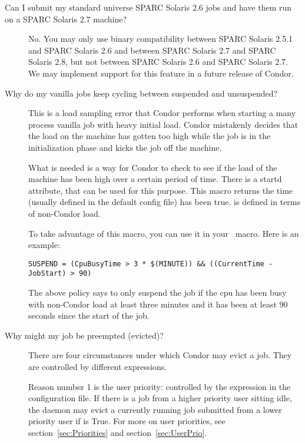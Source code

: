 \begin{description}
\begin{enumerate}
\end{enumerate}

\item[Can I submit my standard universe SPARC Solaris 2.6 jobs and have them run on a SPARC Solaris 2.7 machine?]

No. You may only use binary compatibility between SPARC Solaris 2.5.1
and SPARC Solaris 2.6 and between SPARC Solaris 2.7 and SPARC Solaris
2.8, but not between SPARC Solaris 2.6 and SPARC Solaris 2.7.  We may
implement support for this feature in a future release of Condor.

\item[Why do my vanilla jobs keep cycling between suspended and unsuspended?]

This is a load sampling error that Condor performs when starting a many
process vanilla job with heavy initial load.
Condor mistakenly decides that the load on the machine has gotten too
high while the job is in the initialization phase and kicks the job off
the machine.

What is needed is a way for Condor to check to see if the load of the machine
has been high over a certain period of time. There is a startd attribute,
 that can be used for this purpose. This macro
returns the time (usually defined in the default
config file) has been true.  is defined in terms of
non-Condor load.

To take advantage of this macro, you can use it in your \ macro.
Here is an example:
\begin{verbatim}
SUSPEND = (CpuBusyTime > 3 * $(MINUTE)) && ((CurrentTime - JobStart) > 90)
\end{verbatim}

The above policy says to only suspend the job if the cpu has been busy
with non-Condor load at least three minutes and it has been at least 90
seconds since the start of the job.

\item[Why might my job be preempted (evicted)?]

There are four circumstances under which Condor may evict a job.
They are controlled by different expressions.

Reason number 1 is the user priority:
controlled by the 
expression in the configuration file.
If there is a job from a 
higher priority user sitting idle,
the  daemon may evict 
a currently running job submitted from a lower priority user if 
 is True.
For more on user priorities,
see section~\ref{sec:Priorities} and
section~\ref{sec:UserPrio}.


\end{description}
